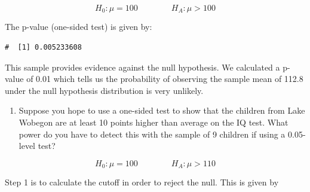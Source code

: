 \documentclass[letterpaper,11pt,twoside,]{pinp}
\providecommand{\tightlist}{%
  \setlength{\itemsep}{0pt}\setlength{\parskip}{0pt}}
\begin{document}
\[
H_0: \mu = 100 \qquad \qquad H_A: \mu > 100
\]

The p-value (one-sided test) is given by:

\begin{Shaded}
\begin{Highlighting}[]
\NormalTok{(} \NormalTok{, } \NormalTok{, }  \SpecialCharTok{/} \NormalTok{(}\NormalTok{), } \NormalTok{)}
\end{Highlighting}
\end{Shaded}

\begin{ShadedResult}
\begin{verbatim}
#  [1] 0.005233608
\end{verbatim}
\end{ShadedResult}

This sample provides evidence against the null hypothesis. We calculated
a p-value of 0.01 which tells us the probability of observing the sample
mean of 112.8 under the null hypothesis distribution is very unlikely.

\begin{enumerate}
\def\labelenumi{\alph{enumi})}
\setcounter{enumi}{1}
\tightlist
\item
  Suppose you hope to use a one-sided test to show that the children
  from Lake Wobegon are at least 10 points higher than average on the IQ
  test. What power do you have to detect this with the sample of 9
  children if using a 0.05-level test?
\end{enumerate}

\[
H_0: \mu = 100 \qquad \qquad H_A: \mu > 110
\]

Step 1 is to calculate the cutoff in order to reject the null. This is
given by

\begin{Shaded}
\begin{Highlighting}[]
\OtherTok{\textless{}{-}} \NormalTok{(} \NormalTok{, } \NormalTok{, }  \SpecialCharTok{/} \NormalTok{(}\NormalTok{)))}
\end{Highlighting}
\end{Shaded}
\end{document}
